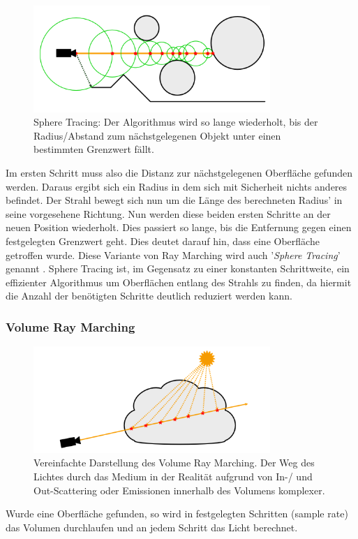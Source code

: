 \begin{figure}[h]
	\centering
	\includegraphics[width=0.80\textwidth]{Grafiken/Basics/Volume/Sphere_Tracing.png}
	\begin{footnotesize}
		\caption{Sphere Tracing: Der Algorithmus wird so lange wiederholt, bis der Radius/Abstand zum nächstgelegenen
        Objekt unter einen bestimmten Grenzwert fällt.}
	\end{footnotesize}
\end{figure}



Im ersten Schritt muss also die Distanz zur nächstgelegenen Oberfläche gefunden werden. Daraus ergibt sich ein Radius in dem sich 
mit Sicherheit nichts anderes befindet. Der Strahl bewegt sich nun um die Länge des berechneten Radius' in seine vorgesehene Richtung.
Nun werden diese beiden ersten Schritte an der neuen Position wiederholt. Dies passiert so lange, bis die Entfernung gegen einen festgelegten
Grenzwert geht. Dies deutet darauf hin, dass eine Oberfläche getroffen wurde. Diese Variante von Ray Marching wird auch 
'\textit{Sphere Tracing}' genannt \parencite{Hart95}. Sphere Tracing ist, im Gegensatz zu einer konstanten Schrittweite, ein effizienter Algorithmus um 
Oberflächen entlang des Strahls zu finden, da hiermit die Anzahl der benötigten Schritte deutlich reduziert werden kann. 


\subsubsection{Volume Ray Marching}

\begin{figure}[h]
	\centering
    \includegraphics[width=0.80\textwidth]{Grafiken/Basics/Volume/Volume_RayMarching.png}
	\begin{footnotesize}
		\caption{Vereinfachte Darstellung des Volume Ray Marching. Der Weg des Lichtes durch 
        das Medium in der Realität aufgrund von In-/ und Out-Scattering oder Emissionen innerhalb des
        Volumens komplexer.}
	\end{footnotesize}
\end{figure}


Wurde eine Oberfläche gefunden, so wird in festgelegten Schritten (sample rate) das Volumen durchlaufen und an jedem Schritt das Licht berechnet.



